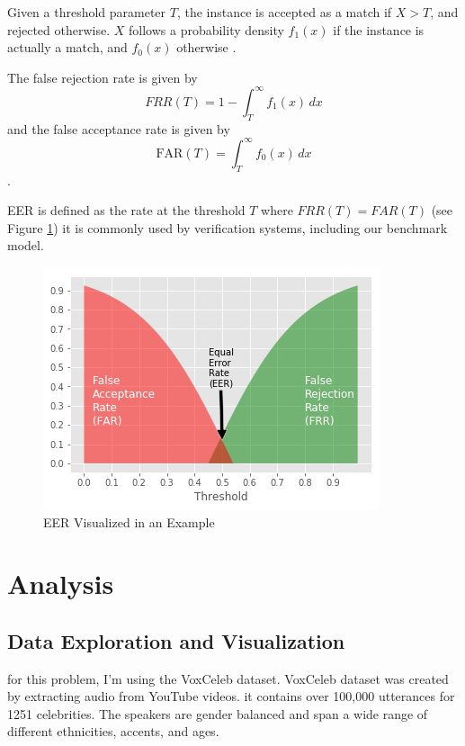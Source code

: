 \documentclass{article}
\begin{document}
Given a threshold parameter $T$, the instance is accepted as a match if $X>T$, and rejected otherwise.
$X$ follows a probability density $f_1(x)$
if the instance is actually a match, and $f_0(x)$ otherwise \cite{wiki:xxx}.

The false rejection rate is given by 
\begin{equation}
FRR(T) = 1- \int_{T}^\infty f_1(x) \, dx
\end{equation}
and the false acceptance rate is given by 
\begin{equation}
\mbox{FAR}(T)= \int_{T}^\infty f_0(x) \, dx 
\end{equation}. 

EER is defined as the rate at the threshold $T$ where $FRR(T) = FAR(T)$ (see Figure \ref{fig:EER})
it is commonly used by verification systems, including our benchmark model.

\begin{figure}[H]
    \centering
    \includegraphics[scale=.75]{images/eer.png}
    \caption{EER Visualized in an Example}
    \label{fig:EER}
\end{figure}

\section{Analysis}

\subsection{Data Exploration and Visualization}

for this problem, I'm using the VoxCeleb dataset\cite{Nagrani17}.
VoxCeleb dataset was created by extracting audio from YouTube videos.
it contains over 100,000 utterances for 1251 celebrities. The speakers are gender balanced and span a wide range of different ethnicities, accents, and ages.
\end{document}

